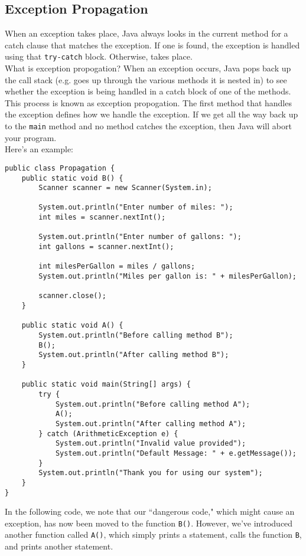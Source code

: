 \subsection{Exception Propagation}

When an exception takes place, Java always looks in the current method for a catch clause that matches the exception. If one is found, the exception is handled using that \verb!try-catch! block. Otherwise,  takes place. \\

What is exception propogation? When an exception occurs, Java pops back up the call stack (e.g. goes up through the various methods it is nested in) to see whether the exception is being handled in a catch block of one of the methods. This process is known as exception propogation. The first method that handles the exception defines how we handle the exception. If we get all the way back up to the \verb!main! method and no method catches the exception, then Java will abort your program. \\

Here's an example:

\begin{lstlisting}
public class Propagation {
	public static void B() {
		Scanner scanner = new Scanner(System.in);

		System.out.println("Enter number of miles: ");
		int miles = scanner.nextInt();

		System.out.println("Enter number of gallons: ");
		int gallons = scanner.nextInt();

		int milesPerGallon = miles / gallons;
		System.out.println("Miles per gallon is: " + milesPerGallon);

		scanner.close();
	}

	public static void A() {
		System.out.println("Before calling method B");
		B();
		System.out.println("After calling method B");
	}

	public static void main(String[] args) {
		try {
			System.out.println("Before calling method A");
			A();
			System.out.println("After calling method A");
		} catch (ArithmeticException e) {
			System.out.println("Invalid value provided");
			System.out.println("Default Message: " + e.getMessage());
		}
		System.out.println("Thank you for using our system");
	}
}
\end{lstlisting}

In the following code, we note that our ``dangerous code," which might cause an exception, has now been moved to the function \verb!B()!. However, we've introduced another function called \verb!A()!, which simply prints a statement, calls the function \verb!B!, and prints another statement. \\

